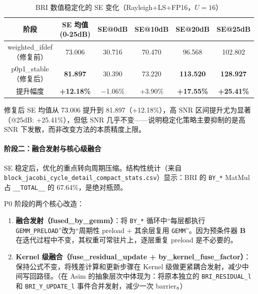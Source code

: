     \begin{table}[H]
        \centering
        \caption{BRI 数值稳定化的 SE 变化（Rayleigh+LS+FP16，$U=16$）}
        \begin{tabular}{c|ccccc}
            \toprule 阶段                   & SE 均值(0-25dB)     & SE@0dB    & SE@10dB & SE@20dB           & SE@25dB           \\
            \midrule weighted\_ifdef（修复前） & 73.006            & 30.716    & 70.470  & 96.568            & 102.802           \\
            p0p1\_stable（修复后）             & \textbf{81.897}   & 30.390    & 73.220  & \textbf{113.520}  & \textbf{128.927}  \\
            \midrule 提升幅度                 & \textbf{+12.18\%} & $-$1.06\% & +3.90\% & \textbf{+17.55\%} & \textbf{+25.41\%} \\
            \bottomrule
        \end{tabular}
    \end{table}

    修复后 SE 均值从 73.006 提升到 81.897（+12.18\%），高 SNR 区间提升尤为显著（@25dB:
    +25.41\%），但低 SNR 几乎不变——说明稳定化策略主要抑制的是高 SNR 下发散，而非改变方法的本质精度上限。

    \paragraph{阶段二：融合发射与核心级融合}

    SE 稳定后，优化的重点转向周期压缩。结构性统计（来自 \texttt{block\_jacobi\_cycle\_detail\_compact\_stats.csv}）显示：BRI
    的 \texttt{BY\_*} MatMul 占 \texttt{\_\_TOTAL\_\_} 的 67.64\%，是绝对瓶颈。

    P0 阶段的两个核心改造：

    \begin{enumerate}
        \item \textbf{融合发射（fused\_by\_gemm）}：将 \texttt{BY\_*}
            循环中“每层都执行 \texttt{GEMM\_PRELOAD}”改为“周期性 preload +
            其余层复用 \texttt{GEMM}”。因为预条件器 $\bm{B}$
            在迭代过程中不变，其权重可常驻片上，逐层重复 preload 是不必要的。

        \item \textbf{Kernel 级融合（fuse\_residual\_update + by\_kernel\_fuse\_factor）}：保持公式不变，将残差计算和更新步骤在
            Kernel 级做更紧耦合发射，减少中间写回路径。（在 Asim 的抽象层次中体现为：将原本独立的
            \texttt{BRI\_RESIDUAL\_l} 和 \texttt{BRI\_Y\_UPDATE\_l} 事件合并发射，减少一次
            barrier。）
    \end{enumerate}

